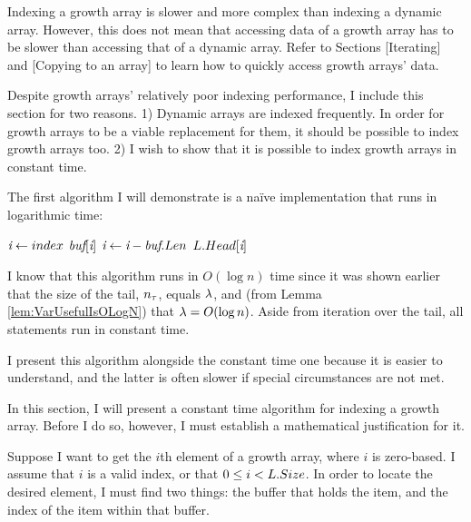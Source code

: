 \HdrGrowthArrayImpl

Indexing a growth array is slower and more complex than indexing a dynamic array. However, this does not mean that accessing data of a growth array has to be slower than accessing that of a dynamic array. Refer to Sections [Iterating] and [Copying to an array] to learn how to quickly access growth arrays' data.

Despite growth arrays' relatively poor indexing performance, I include this section for two reasons. 1) Dynamic arrays are indexed frequently. In order for growth arrays to be a viable replacement for them, it should be possible to index growth arrays too. 2) I wish to show that it is possible to index growth arrays in constant time.

\HdrLogarithmicImpl

The first algorithm I will demonstrate is a na\"{i}ve implementation that runs in logarithmic time:

\begin{algorithm}
	\begin{algorithmic}
			\State $\textit{i} \gets index$
					\State \Return $\textit{buf}[\textit{i}]$
				\EndIf
				\State $\textit{i} \gets \textit{i} - \textit{buf}.Len$
			\EndFor
			\State \Return $L.Head[\textit{i}]$
		\EndFunction
	\end{algorithmic}
\end{algorithm}

I know that this algorithm runs in $O(\log n)$ time since it was shown earlier that the size of the tail, $n_\tau$, equals $\lambda$, and (from Lemma \ref{lem:VarUsefulIsOLogN}) that $\lambda = O(\log n)$. Aside from iteration over the tail, all statements run in constant time.

I present this algorithm alongside the constant time one because it is easier to understand, and the latter is often slower if special circumstances are not met.

\HdrConstantImpl

In this section, I will present a constant time algorithm for indexing a growth array. Before I do so, however, I must establish a mathematical justification for it.

Suppose I want to get the $i$th element of a growth array, where $i$ is zero-based. I assume that $i$ is a valid index, or that $0 \leq i < L.Size$. In order to locate the desired element, I must find two things: the buffer that holds the item, and the index of the item within that buffer.

